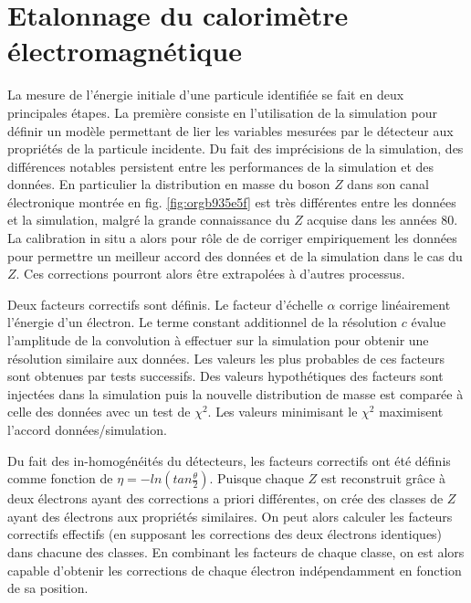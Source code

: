 \section{Etalonnage du calorimètre électromagnétique}

La mesure de l'énergie initiale d'une particule identifiée se fait en deux principales étapes.
La première consiste en l'utilisation de la simulation pour définir un modèle permettant de lier les variables mesurées par le détecteur aux propriétés de la particule incidente.
Du fait des imprécisions de la simulation, des différences notables persistent entre les performances de la simulation et des données.
En particulier la distribution en masse du boson $Z$ dans son canal électronique montrée en fig. \ref{fig:orgb935e5f} est très différentes entre les données et la simulation, malgré la grande connaissance du $Z$ acquise dans les années 80.
La calibration in situ a alors pour rôle de de corriger empiriquement les données pour permettre un meilleur accord des données et de la simulation dans le cas du $Z$.
Ces corrections pourront alors être extrapolées à d'autres processus.

Deux facteurs correctifs sont définis.
Le facteur d'échelle $\alpha$ corrige linéairement l'énergie d'un électron.
Le terme constant additionnel de la résolution $c$ évalue l'amplitude de la convolution à effectuer sur la simulation pour obtenir une résolution similaire aux données.
Les valeurs les plus probables de ces facteurs sont obtenues par tests successifs.
Des valeurs hypothétiques des facteurs sont injectées dans la simulation puis la nouvelle distribution de masse est comparée à celle des données avec un test de $\chi^2$.
Les valeurs minimisant le $\chi^2$ maximisent l'accord données/simulation.

Du fait des in-homogénéités du détecteurs, les facteurs correctifs ont été définis comme fonction de $\eta=-ln(tan\frac{\theta}{2})$.
Puisque chaque $Z$ est reconstruit grâce à deux électrons ayant des corrections a priori différentes, on crée des classes de $Z$ ayant des électrons aux propriétés similaires.
On peut alors calculer les facteurs correctifs effectifs (en supposant les corrections des deux électrons identiques) dans chacune des classes.
En combinant les facteurs de chaque classe, on est alors capable d'obtenir les corrections de chaque électron indépendamment en fonction de sa position.

